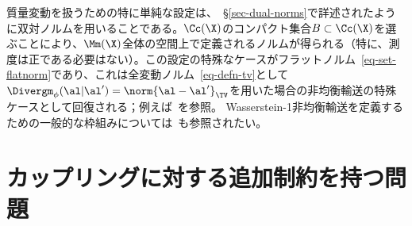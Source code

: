 \begin{rem}[双対ノルムとの関連]\label{rem-unb-dualnorms}
質量変動を扱うための特に単純な設定は、~\S\ref{sec-dual-norms}で詳述されたように双対ノルムを用いることである。$\Cc(\X)$のコンパクト集合$B \subset \Cc(\X)$を選ぶことにより、$\Mm(\X)$全体の空間上で定義されるノルムが得られる（特に、測度は正である必要はない）。この設定の特殊なケースがフラットノルム~\eqref{eq-set-flatnorm}であり、これは全変動ノルム~\eqref{eq-defn-tv}として$\Divergm_\phi(\al|\al')=\norm{\al-\al'}_{\TV}$を用いた場合の非均衡輸送の特殊ケースとして回復される；例えば~\citep{hanin1992kantorovich,lellmann2014imaging}を参照。
%
Wasserstein-1非均衡輸送を定義するための一般的な枠組みについては~\citep{schmitzer2017framework}も参照されたい。
\end{rem}

\section{カップリングに対する追加制約を持つ問題}

